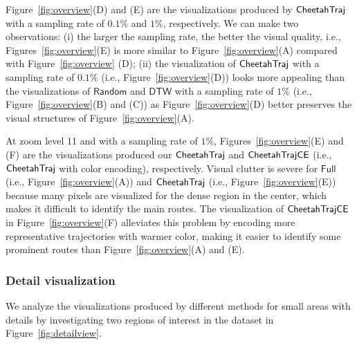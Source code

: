 Figure~\ref{fig:overview}(D) and (E) are the visualizations produced by $\mathsf{CheetahTraj}{}$ with a sampling rate of $0.1\%$ and $1\%$, respectively. We can make two observations: (i) the larger the sampling rate, the better the visual quality, i.e., Figures~\ref{fig:overview}(E) is more similar to Figure~\ref{fig:overview}(A) compared with Figure~\ref{fig:overview} (D); (ii) the visualization of $\mathsf{CheetahTraj}$ with a sampling rate of $0.1\%$ (i.e., Figure~\ref{fig:overview}(D)) looks more appealing than the visualizations of $\mathsf{Random}$ and $\mathsf{DTW}$ with a sampling rate of $1\%$ (i.e., Figure~\ref{fig:overview}(B) and (C)) as Figure~\ref{fig:overview}(D) better preserves the visual structures of Figure~\ref{fig:overview}(A).



 At zoom level 11 and with a sampling rate of $1\%$, Figures~\ref{fig:overview}(E) and (F) are the visualizations produced our $\mathsf{CheetahTraj}$ and $\mathsf{CheetahTraj}\mathsf{CE}$ (i.e., $\mathsf{CheetahTraj}$ with color encoding), respectively.
Visual clutter is severe for $\mathsf{Full}$ (i.e., Figure~\ref{fig:overview}(A)) and $\mathsf{CheetahTraj}$ (i.e., Figure~\ref{fig:overview}(E)) because many pixels are visualized for the dense region in the center, which makes it difficult to identify the main routes. The visualization of $\mathsf{CheetahTraj}\mathsf{CE}$ in Figure~\ref{fig:overview}(F) alleviates this problem by encoding more representative trajectories with warmer color, making it easier to identify some prominent routes than Figure~\ref{fig:overview}(A) and (E).

\vspace{1mm}
\subsubsection{Detail visualization}\label{sec:detail}




We analyze the visualizations produced by different methods for small areas with details by investigating two regions of interest in the \pt{} dataset in Figure~\ref{fig:detailview}.





